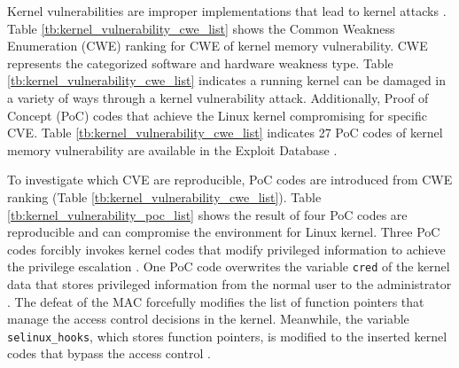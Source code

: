 Kernel vulnerabilities are improper implementations that lead to kernel attacks
\cite{chen11linux}. 
%
Table \ref{tb:kernel_vulnerability_cwe_list} shows the Common Weakness Enumeration
(CWE) ranking for CWE of kernel memory vulnerability. CWE represents the
categorized software and hardware weakness type. 
%
Table \ref{tb:kernel_vulnerability_cwe_list} indicates a running kernel can be
damaged in a variety of ways through a kernel vulnerability attack. 
% 
%
Additionally, Proof of Concept (PoC) codes that achieve the Linux kernel
compromising for specific CVE. Table \ref{tb:kernel_vulnerability_cwe_list}
indicates 27 PoC codes of kernel memory vulnerability are available in the
Exploit Database \cite{exploitdb}. 

%

%
To investigate which CVE are reproducible, PoC codes are introduced from CWE
ranking (Table \ref{tb:kernel_vulnerability_cwe_list}).
Table \ref{tb:kernel_vulnerability_poc_list} shows the result of four PoC codes are
reproducible and can compromise the environment for Linux kernel.
%
Three PoC codes forcibly invokes kernel codes that modify privileged information
to achieve the privilege escalation
\cite{CVE-2016-4997,CVE-2016-9793,CVE-2017-1000112}. 
%
One PoC code overwrites the variable \verb|cred| of the
kernel data that stores privileged information from the normal user to the
administrator \cite{CVE-2017-16995}.
%
The defeat of the MAC forcefully modifies the list of function pointers that
manage the access control decisions in the kernel. Meanwhile, the variable
\verb|selinux_hooks|, which stores function pointers, is modified to the inserted
kernel 
codes that bypass the access control \cite{nexus5exploit,grsecurity}.

